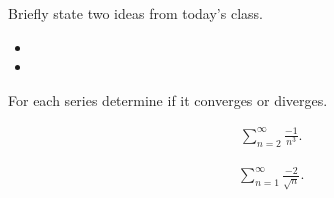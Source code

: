 \postClass

\begin{problem}
\item Briefly state two ideas from today's class.
  \begin{itemize}
  \item
  \item
  \end{itemize}
\item
  \begin{subproblem}
    \item
  \end{subproblem}
\end{problem}


\begin{problem}
\item For each series determine if it converges or diverges.
  \begin{subproblem}
  \item
    \begin{eqnarray*}
      & & \sum^\infty_{n=2} \frac{-1}{n^3}.
    \end{eqnarray*}
    \vfill
  \item
    \begin{eqnarray*}
      & & \sum^\infty_{n=1} \frac{-2}{\sqrt{n}}.
    \end{eqnarray*}
    \vfill
  \end{subproblem}
\end{problem}



